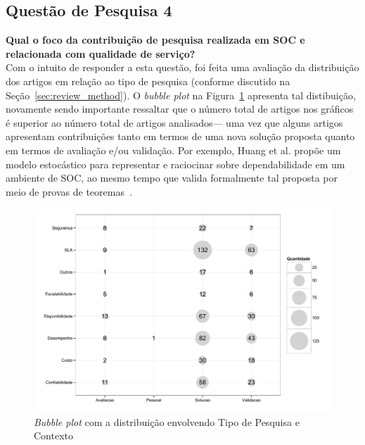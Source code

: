 \subsection{Questão de Pesquisa 4}

\textbf{Qual o foco da contribuição de pesquisa realizada em SOC e relacionada com qualidade de serviço? }
\\[0.01in]

Com o intuito de responder a esta questão, foi feita uma avalia\c c\~{a}o da distribui\c c\~{a}o dos 
artigos em rela\c c\~{a}o ao tipo de pesquisa (conforme discutido na Se\c c\~{a}o~\ref{sec:review_method}). 
O \emph{bubble plot} na Figura~\ref{fig:bubbleplot-QoSRes}  apresenta tal distibui\c c\~{a}o, novamente sendo importante ressaltar que o n\'{u}mero total de artigos nos gr\'{a}ficos \'{e} superior ao n\'{u}mero total de artigos analisados--- uma vez que alguns artigos apresentam contribui\c c\~{o}es tanto em termos de uma nova solu\c c\~{a}o proposta quanto em termos de avalia\c c\~{a}o e/ou valida\c c\~{a}o. Por exemplo, Huang et al. prop\~{o}e um modelo estoc\'{a}stico para representar e raciocinar sobre dependabilidade em um ambiente de SOC, ao mesmo tempo que valida formalmente tal proposta por meio de provas de teoremas~\cite{huang:scc2011}.

\begin{figure}[htb]
\centering
\includegraphics[scale=0.55]{imagens/pesquisaContexto2.pdf}
\caption{\emph{Bubble plot} com a distribui\c{c}\~{a}o envolvendo Tipo de Pesquisa e Contexto}
\label{fig:bubbleplot-QoSRes}
\end{figure}

